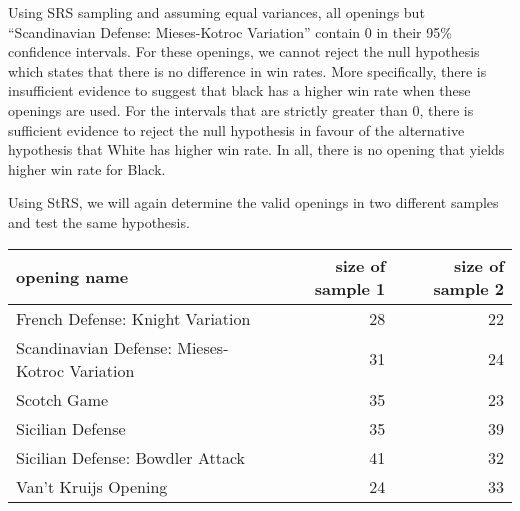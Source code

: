 \documentclass[11pt,]{article}
\begin{document}
\begin{table}[!h]
\centering
{}
\end{table}

Using SRS sampling and assuming equal variances, all openings but
``Scandinavian Defense: Mieses-Kotroc Variation'' contain 0 in their
95\% confidence intervals. For these openings, we cannot reject the null
hypothesis which states that there is no difference in win rates. More
specifically, there is insufficient evidence to suggest that black has a
higher win rate when these openings are used. For the intervals that are
strictly greater than 0, there is sufficient evidence to reject the null
hypothesis in favour of the alternative hypothesis that White has higher
win rate. In all, there is no opening that yields higher win rate for
Black.

Using StRS, we will again determine the valid openings in two different
samples and test the same hypothesis. \newline

\begin{tabular}{l|r|r}
\hline
opening name & size of sample 1 & size of sample 2\\
\hline
French Defense: Knight Variation & 28 & 22\\
\hline
Scandinavian Defense: Mieses-Kotroc Variation & 31 & 24\\
\hline
Scotch Game & 35 & 23\\
\hline
Sicilian Defense & 35 & 39\\
\hline
Sicilian Defense: Bowdler Attack & 41 & 32\\
\hline
Van't Kruijs Opening & 24 & 33\\
\hline
\end{tabular}
\end{document}

